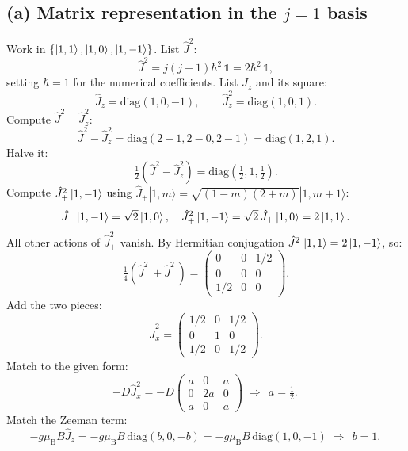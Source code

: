 \documentclass[11pt]{article}
\begin{document}
\subsection*{(a) Matrix representation in the $j=1$ basis}

Work in $\{\ket{1,1},\ket{1,0},\ket{1,-1}\}$. List $\hat J^2$:
\begin{equation}
\hat J^{2}=j(j+1)\hbar^{2}\,\mathbb 1=2\hbar^{2}\,\mathbb 1,
\end{equation}
setting $\hbar=1$ for the numerical coefficients. List $\hat J_z$ and its square:
\begin{equation}
\hat J_{z}=\mathrm{diag}(1,0,-1),\qquad \hat J_{z}^{2}=\mathrm{diag}(1,0,1).
\end{equation}
Compute $\hat J^2-\hat J_z^2$:
\begin{equation}
\hat J^{2}-\hat J_{z}^{2}=\mathrm{diag}(2-1,2-0,2-1)=\mathrm{diag}(1,2,1).
\end{equation}
Halve it:
\begin{equation}
\tfrac12(\hat J^{2}-\hat J_{z}^{2})=\mathrm{diag}(\tfrac12,1,\tfrac12).
\end{equation}
Compute $\hat J_+^2\ket{1,-1}$ using $\hat J_+|1,m\rangle=\sqrt{(1-m)(2+m)}|1,m+1\rangle$:
\begin{equation}
\hat J_+\ket{1,-1}=\sqrt 2\ket{1,0},\quad\hat J_+^{2}\ket{1,-1}=\sqrt 2\,\hat J_+\ket{1,0}=2\ket{1,1}.
\end{equation}
All other actions of $\hat J_+^2$ vanish. By Hermitian conjugation $\hat J_-^2\ket{1,1}=2\ket{1,-1}$, so:
\begin{equation}
\tfrac{1}{4}(\hat J_+^{2}+\hat J_-^{2})=\begin{pmatrix}0&0&1/2\\0&0&0\\1/2&0&0\end{pmatrix}.
\end{equation}
Add the two pieces:
\begin{equation}
\hat J_{x}^{2}=\begin{pmatrix}1/2&0&1/2\\0&1&0\\1/2&0&1/2\end{pmatrix}.
\label{eq:Jx2}
\end{equation}
Match to the given form:
\begin{equation}
-D\hat J_x^2=-D\begin{pmatrix}a&0&a\\0&2a&0\\a&0&a\end{pmatrix}\;\Rightarrow\;\boxed{\,a=\tfrac12.\,}
\end{equation}
Match the Zeeman term:
\begin{equation}
-g\mu_{\mathrm B}B\hat J_z=-g\mu_{\mathrm B}B\,\mathrm{diag}(b,0,-b)=-g\mu_{\mathrm B}B\,\mathrm{diag}(1,0,-1)\;\Rightarrow\;\boxed{\,b=1.\,}
\end{equation}
\end{document}
